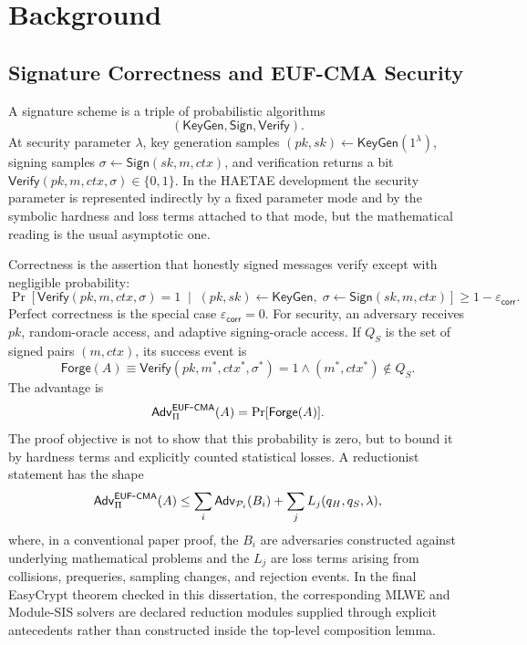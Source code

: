 \chapter{Background}
\label{ch:background}

\section{Signature Correctness and EUF-CMA Security}

A signature scheme is a triple of probabilistic algorithms
\[
  (\mathsf{KeyGen}, \mathsf{Sign}, \mathsf{Verify}).
\]
At security parameter \(\lambda\), key generation samples
\((pk,sk)\leftarrow\mathsf{KeyGen}(1^\lambda)\), signing samples
\(\sigma\leftarrow\mathsf{Sign}(sk,m,ctx)\), and verification returns a bit
\(\mathsf{Verify}(pk,m,ctx,\sigma)\in\{0,1\}\).  In the HAETAE development the
security parameter is represented indirectly by a fixed parameter mode and by
the symbolic hardness and loss terms attached to that mode, but the mathematical
reading is the usual asymptotic one.

Correctness is the assertion that honestly signed messages verify except with
negligible probability:
\[
  \Pr\!\left[
    \mathsf{Verify}(pk,m,ctx,\sigma)=1
    \;\middle|\;
    (pk,sk)\leftarrow\mathsf{KeyGen},\;
    \sigma\leftarrow\mathsf{Sign}(sk,m,ctx)
  \right]\ge 1-\varepsilon_{\mathsf{corr}}.
\]
Perfect correctness is the special case \(\varepsilon_{\mathsf{corr}}=0\).
For \eufcma{} security, an adversary receives \(pk\), random-oracle access, and
adaptive signing-oracle access.  If \(Q_S\) is the set of signed pairs
\((m,ctx)\), its success event is
\[
  \mathsf{Forge}(A) \equiv
  \mathsf{Verify}(pk,m^*,ctx^*,\sigma^*)=1
  \land (m^*,ctx^*)\notin Q_S .
\]
The advantage is
\[
  \mathsf{Adv}_{\Pi}^{\mathsf{EUF}\mbox{-}\mathsf{CMA}}(A)=\Pr[\mathsf{Forge}(A)].
\]
The proof objective is not to show that this probability is zero, but to bound
it by hardness terms and explicitly counted statistical losses.  A reductionist
statement has the shape
\[
  \mathsf{Adv}_{\Pi}^{\mathsf{EUF}\mbox{-}\mathsf{CMA}}(A)
  \le
  \sum_i \mathsf{Adv}_{\mathcal{P}_i}(B_i)
  + \sum_j L_j(q_H,q_S,\lambda),
\]
where, in a conventional paper proof, the \(B_i\) are adversaries constructed
against underlying mathematical problems and the \(L_j\) are loss terms arising
from collisions, prequeries, sampling changes, and rejection events.  In the
final EasyCrypt theorem checked in this dissertation, the corresponding MLWE and
Module-SIS solvers are declared reduction modules supplied through explicit
antecedents rather than constructed inside the top-level composition lemma.

